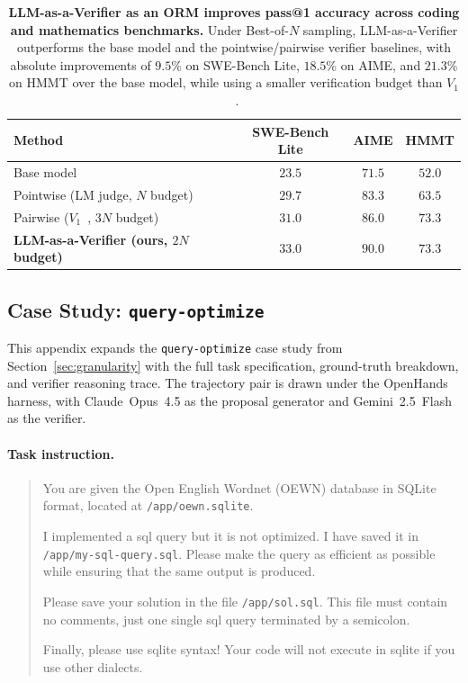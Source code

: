 \begin{table}[!ht]
    \centering
    \caption{\textbf{LLM-as-a-Verifier as an ORM improves pass@1 accuracy across coding and mathematics benchmarks.} Under Best-of-$N$ sampling, LLM-as-a-Verifier outperforms the base model and the pointwise/pairwise verifier baselines, with absolute improvements of $9.5\%$ on SWE-Bench Lite, $18.5\%$ on AIME, and $21.3\%$ on HMMT over the base model, while using a smaller verification budget than $V_1$~\citep{singh_v_1_2026}.}
    \label{tab:orm_results}
    \small
    \begin{tabular}{lccc}
    \toprule
    Method & SWE-Bench Lite & AIME & HMMT \\
    \midrule
    Base model                                                & $23.5$ & $71.5$ & $52.0$ \\
    Pointwise (LM judge, $N$ budget)                          & $29.7$ & $83.3$ & $63.5$ \\
    Pairwise ($V_1$~\citep{singh_v_1_2026}, $3N$ budget)      & $31.0$ & $86.0$ & $73.3$ \\
    \textbf{LLM-as-a-Verifier (ours, $2N$ budget)}            & $\mathbf{33.0}$ & $\mathbf{90.0}$ & $\mathbf{73.3}$ \\
    \bottomrule
    \end{tabular}
\end{table}

\subsection{Case Study: \texttt{query-optimize}}
\label{app:query-optimize-example}

This appendix expands the \texttt{query-optimize} case study from Section~\ref{sec:granularity} with the full task specification, ground-truth breakdown, and verifier reasoning trace. The trajectory pair is drawn under the OpenHands harness, with Claude~Opus~4.5 as the proposal generator and Gemini~2.5~Flash as the verifier.

\paragraph{Task instruction.}
\begin{quote}\small
You are given the Open English Wordnet (OEWN) database in SQLite format, located at \texttt{/app/oewn.sqlite}.

I implemented a sql query but it is not optimized. I have saved it in \texttt{/app/my-sql-query.sql}. Please make the query as efficient as possible while ensuring that the same output is produced.

Please save your solution in the file \texttt{/app/sol.sql}. This file must contain no comments, just one single sql query terminated by a semicolon.

Finally, please use sqlite syntax! Your code will not execute in sqlite if you use other dialects.
\end{quote}

